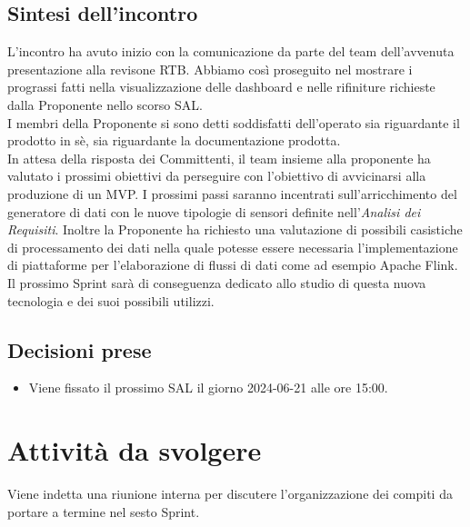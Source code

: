 \documentclass[8pt]{article}
\newcommand{\signatureline}[1]{%
	 \par\vspace{0.5cm}
	\noindent\makebox[\linewidth][r]{\rule{0.2\textwidth}{0.5pt}\hspace{3cm}\makebox[0pt][r]{\vspace{3pt}\footnotesize #1}}%
}
\begin{document}
\subsection{Sintesi dell'incontro}
L'incontro ha avuto inizio con la comunicazione da parte del team dell'avvenuta presentazione alla revisone RTB. 
Abbiamo così proseguito nel mostrare i prograssi fatti nella visualizzazione delle dashboard e nelle rifiniture richieste dalla Proponente nello scorso SAL. \\
I membri della Proponente si sono detti soddisfatti dell'operato sia riguardante il prodotto in sè, sia riguardante la documentazione prodotta. \\
In attesa della risposta dei Committenti, il team insieme alla proponente ha valutato i prossimi obiettivi da perseguire con l'obiettivo di avvicinarsi alla produzione di un MVP. 
I prossimi passi saranno incentrati sull'arricchimento del generatore di dati con le nuove tipologie di sensori definite nell'\textit{Analisi dei Requisiti}.
Inoltre la Proponente ha richiesto una valutazione di possibili casistiche di processamento dei dati nella quale potesse essere necessaria l'implementazione di piattaforme per l'elaborazione di flussi di dati come ad esempio Apache Flink.\\
Il prossimo Sprint sarà di conseguenza dedicato allo studio di questa nuova tecnologia e dei suoi possibili utilizzi.
\subsection{Decisioni prese}
\begin{itemize}
	\setlength\itemsep{0em}
	\item Viene fissato il prossimo SAL il giorno 2024-06-21 alle ore 15:00.
\end{itemize}
\newpage
\section{Attività da svolgere}
Viene indetta una riunione interna per discutere l'organizzazione dei compiti da portare a termine nel sesto Sprint. 
\signatureline{Padova, 2024-06-08}
\end{document}
